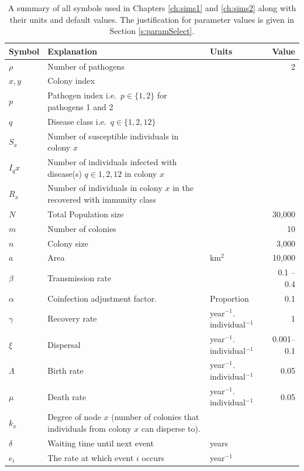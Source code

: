 \begin{table}[b!]
\centering
\caption[All symbols used in Chapters \ref{ch:sims1} and \ref{ch:sims2}.]{A summary of all symbols used in Chapters \ref{ch:sims1} and \ref{ch:sims2} along with their units and default values.
The justification for parameter values is given in Section \ref{s:paramSelect}.}

\begin{tabular}{@{}lp{6cm}p{2.9cm}r@{}}
\toprule
Symbol & Explanation & Units & Value\\
\midrule
$\rho$ & Number of pathogens && 2\\
$x, y$ & Colony index &&\\
$p$ &  Pathogen index i.e.\ $p\in\{1,2\}$ for pathogens 1 and 2 & &\\
$q$ & Disease class i.e.\ $q\in\{1,2,12\}$&\\
$S_x$ & Number of susceptible individuals in colony $x$ &&\\
$I_qx$ & Number of individuals infected with disease(s) $q \in {1, 2, 12}$ in colony $x$ &&\\
$R_x$ & Number of individuals in colony $x$ in the recovered with immunity class  &&\\
$N$ & Total Population size && 30,000\\
$m$ & Number of colonies&& 10\\
$n$ & Colony size && 3,000\\
$a$ & Area & km$^2$& 10,000\\
$\beta$ & Transmission rate &  & 0.1 -- 0.4\\
$\alpha$ & Coinfection adjustment factor.  & Proportion & 0.1\\
$\gamma$ & Recovery rate & year$^{-1}.$individual$^{-1}$ & 1\\
$\xi$ & Dispersal & year$^{-1}.$individual$^{-1}$ & 0.001--0.1\\
$\Lambda$ & Birth rate & year$^{-1}.$individual$^{-1}$ & 0.05\\
$\mu$ & Death rate & year$^{-1}.$individual$^{-1}$ & 0.05\\
$k_x$ & Degree of node $x$ (number of colonies that individuals from colony $x$ can disperse to). &&\\
$\delta$ & Waiting time until next event & years &\\

$e_i$ & The rate at which event $i$ occurs & year$^{-1}$&\\
\bottomrule
\end{tabular}

\label{t:params}
\end{table}


